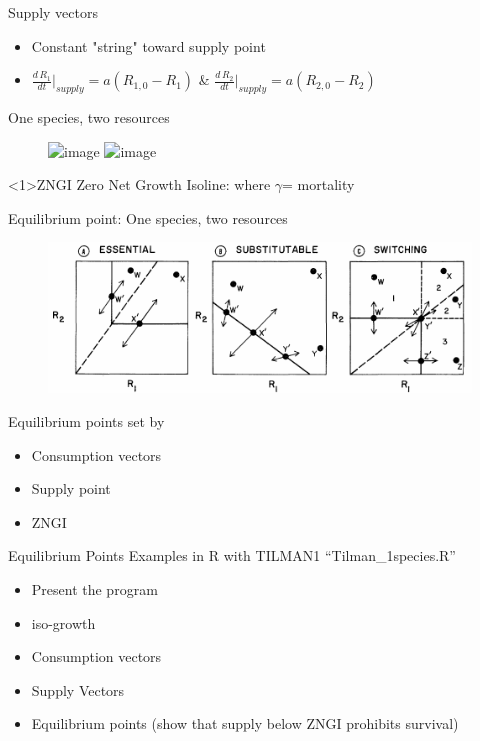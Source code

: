 \documentclass[final,xcolor=dvipsnames]{beamer}
\begin{document}
\begin{frame}{Supply vectors}
{   \begin{itemize}
   \item Constant "string" toward supply point
   \item $\frac{d\,R_1}{dt}|_{supply}= a(R_{1,0}-R_1)$ \& $\frac{d\,R_2}{dt}|_{supply}= a(R_{2,0}-R_2)$
   \end{itemize}
}
\end{frame}

\begin{frame}{One species, two resources}  
\begin{figure}
       \includegraphics<1>[width=.5\framewidth]{ZNGIss}
       \includegraphics<2>[width=.5\framewidth]{Eq} 
   \end{figure} 
\begin{block}<1>{ZNGI}
Zero Net Growth Isoline: where $\gamma$= mortality
\end{block}
\end{frame}

\begin{frame}{Equilibrium point: One species, two resources}  
	\begin{figure}
       \includegraphics[width=.8\framewidth]{ZNGI}
    \end{figure}
    Equilibrium points set by 
  \begin{itemize}
  \item Consumption vectors
  \item Supply point
  \item ZNGI
  \end{itemize}
\end{frame}

\begin{frame}{Equilibrium Points}  
Examples in R with TILMAN1 ``Tilman\_1species.R''
\begin{itemize}
\item Present the program
\item iso-growth
\item Consumption vectors
\item Supply Vectors
\item Equilibrium points (show that supply below ZNGI prohibits survival)
\end{itemize}
\end{frame}
\end{document}
